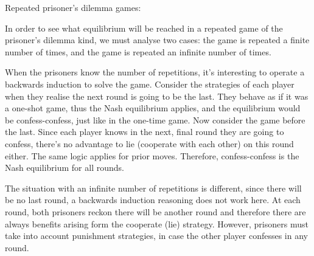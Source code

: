  

Repeated prisoner’s dilemma games:

In order to see what equilibrium will be reached in a repeated game of the prisoner’s dilemma kind, we must analyse two cases: the game is repeated a finite number of times, and the game is repeated an infinite number of times.

When the prisoners know the number of repetitions, it’s interesting to operate a backwards induction to solve the game. Consider the strategies of each player when they realise the next round is going to be the last. They behave as if it was a one-shot game, thus the Nash equilibrium applies, and the equilibrium would be confess-confess, just like in the one-time game. Now consider the game before the last. Since each player knows in the next, final round they are going to confess, there’s no advantage to lie (cooperate with each other) on this round either. The same logic applies for prior moves. Therefore, confess-confess is the Nash equilibrium for all rounds.

The situation with an infinite number of repetitions is different, since there will be no last round, a backwards induction reasoning does not work here. At each round, both prisoners reckon there will be another round and therefore there are always benefits arising form the cooperate (lie) strategy. However, prisoners must take into account punishment strategies, in case the other player confesses in any round.

